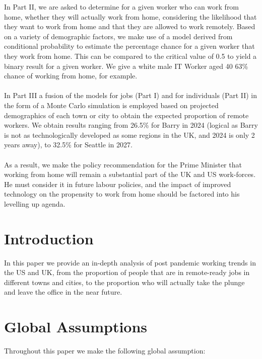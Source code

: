 \documentclass{mthree}
\begin{document}
       In Part II, we are asked to determine for a given worker who can work from home, whether they will actually work from home, considering the likelihood that they want to work from home and that they are allowed to work remotely. Based on a variety of demographic factors, we make use of a model derived from conditional probability to estimate the percentage chance for a given worker that they work from home. This can be compared to the critical value of 0.5 to yield a binary result for a given worker. We give a white male IT Worker aged 40 63\% chance of working from home, for example.  
       \\\\
       In Part III a fusion of the models for jobs (Part I) and for individuals (Part II) in the form of a Monte Carlo simulation is employed based on projected demographics of each town or city to obtain the expected proportion of remote workers. We obtain results ranging from 26.5\% for Barry in 2024 (logical as Barry is not as technologically developed as some regions in the UK, and 2024 is only 2 years away), to 32.5\% for Seattle in 2027.
       \\\\
       As a result, we make the policy recommendation for the Prime Minister that working from home will remain a substantial part of the UK and US work-forces. He must consider it in future labour policies, and the impact of improved technology on the propensity to work from home should be factored into his levelling up agenda. 
      

        
    
    \newpage %
    \setcounter{tocdepth}{2}
    \tableofcontents
    \newpage
    
    \section{Introduction}    
        In this paper we provide an in-depth analysis of post pandemic working trends in the US and UK, from the proportion of people that are in remote-ready jobs in different towns and cities, to the proportion who will actually take the plunge and leave the office in the near future.
        
    \section{Global Assumptions}
        Throughout this paper we make the following global assumption:
\end{document}
